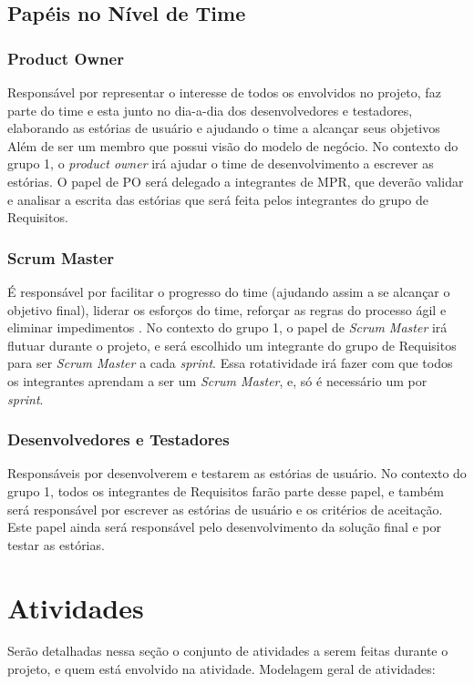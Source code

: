 \subsection{Papéis no Nível de Time}

\subsubsection{Product Owner}
Responsável por representar o interesse de todos os envolvidos no projeto, faz parte do time e esta junto no dia-a-dia dos desenvolvedores e testadores, elaborando as estórias de usuário e ajudando o time a alcançar seus objetivos \cite[p. 47-48]{safe001} Além de ser um membro que possui visão do modelo de negócio. No contexto do grupo 1, o \emph{product owner} irá ajudar o time de desenvolvimento a escrever as estórias. O papel de PO será delegado a integrantes de MPR, que deverão validar e analisar a escrita das estórias que será feita pelos integrantes do grupo de Requisitos.

\subsubsection{Scrum Master}
É responsável por facilitar o progresso do time (ajudando assim a se alcançar o objetivo final), liderar os esforços do time, reforçar as regras do processo ágil e eliminar impedimentos \cite[p. 47-48]{safe001}. No contexto do grupo 1, o papel de \emph{Scrum Master} irá flutuar durante o projeto, e será escolhido um integrante do grupo de Requisitos para ser \emph{Scrum Master} a cada \emph{sprint}. Essa rotatividade irá fazer com que todos os integrantes aprendam a ser um \emph{Scrum Master}, e, só é necessário um por \emph{sprint}.

\subsubsection{Desenvolvedores e Testadores}
Responsáveis por desenvolverem e testarem as estórias de usuário. No contexto do grupo 1, todos os integrantes de Requisitos farão parte desse papel, e também será responsável por escrever as estórias de usuário e os critérios de aceitação. Este papel ainda será responsável pelo desenvolvimento da solução final e por testar as estórias.


\newpage

\section{Atividades}
Serão detalhadas nessa seção o conjunto de atividades a serem feitas durante o projeto, e quem está envolvido na atividade.
Modelagem geral de atividades:

